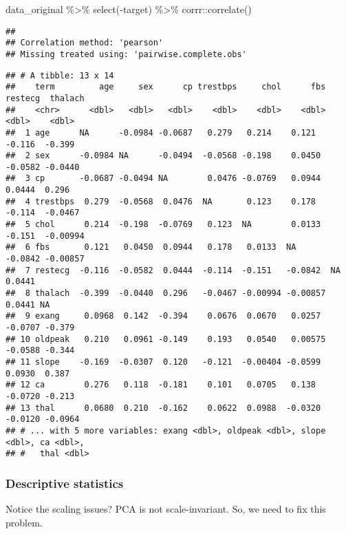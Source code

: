 \documentclass[
]{book}
\newenvironment{Shaded}{\begin{snugshade}}{\end{snugshade}}
\newcommand{\FunctionTok}[1]{\textcolor[rgb]{0.00,0.00,0.00}{#1}}
\newcommand{\NormalTok}[1]{#1}
\newcommand{\SpecialCharTok}[1]{\textcolor[rgb]{0.00,0.00,0.00}{#1}}
\begin{document}
\begin{Shaded}
\begin{Highlighting}[]
\NormalTok{data\_original }\SpecialCharTok{\%\textgreater{}\%}
  \FunctionTok{select}\NormalTok{(}\SpecialCharTok{{-}}\NormalTok{target) }\SpecialCharTok{\%\textgreater{}\%}
\NormalTok{  corrr}\SpecialCharTok{::}\FunctionTok{correlate}\NormalTok{()}
\end{Highlighting}
\end{Shaded}

\begin{verbatim}
## 
## Correlation method: 'pearson'
## Missing treated using: 'pairwise.complete.obs'
\end{verbatim}

\begin{verbatim}
## # A tibble: 13 x 14
##    term         age     sex      cp trestbps     chol      fbs restecg  thalach
##    <chr>      <dbl>   <dbl>   <dbl>    <dbl>    <dbl>    <dbl>   <dbl>    <dbl>
##  1 age      NA      -0.0984 -0.0687   0.279   0.214    0.121   -0.116  -0.399  
##  2 sex      -0.0984 NA      -0.0494  -0.0568 -0.198    0.0450  -0.0582 -0.0440 
##  3 cp       -0.0687 -0.0494 NA        0.0476 -0.0769   0.0944   0.0444  0.296  
##  4 trestbps  0.279  -0.0568  0.0476  NA       0.123    0.178   -0.114  -0.0467 
##  5 chol      0.214  -0.198  -0.0769   0.123  NA        0.0133  -0.151  -0.00994
##  6 fbs       0.121   0.0450  0.0944   0.178   0.0133  NA       -0.0842 -0.00857
##  7 restecg  -0.116  -0.0582  0.0444  -0.114  -0.151   -0.0842  NA       0.0441 
##  8 thalach  -0.399  -0.0440  0.296   -0.0467 -0.00994 -0.00857  0.0441 NA      
##  9 exang     0.0968  0.142  -0.394    0.0676  0.0670   0.0257  -0.0707 -0.379  
## 10 oldpeak   0.210   0.0961 -0.149    0.193   0.0540   0.00575 -0.0588 -0.344  
## 11 slope    -0.169  -0.0307  0.120   -0.121  -0.00404 -0.0599   0.0930  0.387  
## 12 ca        0.276   0.118  -0.181    0.101   0.0705   0.138   -0.0720 -0.213  
## 13 thal      0.0680  0.210  -0.162    0.0622  0.0988  -0.0320  -0.0120 -0.0964 
## # ... with 5 more variables: exang <dbl>, oldpeak <dbl>, slope <dbl>, ca <dbl>,
## #   thal <dbl>
\end{verbatim}

\hypertarget{descriptive-statistics}{%
\subsubsection{Descriptive statistics}\label{descriptive-statistics}}

Notice the scaling issues? PCA is not scale-invariant. So, we need to fix this problem.
\end{document}
